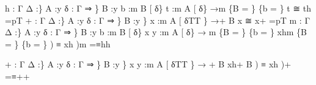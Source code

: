 \documentclass{acm_proc_article-sp}
\begin{document}
{\begin{code}
h : \AgdaBound{\{}Γ Δ :\}
         \AgdaBound{\{}A :y \AgdaBound{\{}δ : Γ ⇒ \}
         \AgdaBound{\{}B :y \AgdaBound{\{}b :m \AgdaBound{(}B [ δ\AgdaFunction{ ]}\}  
         \AgdaBound{\{}t :m \AgdaBound{(}A [ δ\AgdaFunction{ ]}\} 
         →m \{B = \} \{b = \} t ≅ th =pT
+ : \AgdaBound{\{}Γ Δ :\}
         \AgdaBound{\{}A :y \AgdaBound{\{}δ : Γ ⇒ \}
         \AgdaBound{\{}B :y \} 
         \AgdaBound{\{}x :m \AgdaBound{(}A [ δ\AgdaFunction{ ]}T\AgdaFunction{ +}T \}
          →+ B x ≅ x+ =p\AgdaFunction{ [+S]}T
m : \AgdaBound{\{}Γ Δ :\}
         \AgdaBound{\{}A :y \AgdaBound{\{}δ : Γ ⇒ \}
         \AgdaBound{\{}B :y \AgdaBound{\{}b :m \AgdaBound{(}B [ δ\AgdaFunction{ ]}\}  
         \AgdaBound{\{}x y :m \AgdaBound{(}A [ δ\AgdaFunction{ ]}\}
         → m \{B = \} \{b = \} x\AgdaInductiveConstructor{ =}hm \{B = \} \{b = \} ) ≡ \AgdaBound{(}x\AgdaInductiveConstructor{ =}h )m =≡hh

+ : \AgdaBound{\{}Γ Δ :\}
         \AgdaBound{\{}A :y \AgdaBound{\{}δ : Γ ⇒ \}
         \AgdaBound{\{}B :y \} 
         \AgdaBound{\{}x y :m \AgdaBound{(}A [ δ\AgdaFunction{ ]}T\AgdaFunction{ +}T \}
         → + B x\AgdaInductiveConstructor{ =}h+ B ) ≡ \AgdaBound{(}x\AgdaInductiveConstructor{ =}h )+ =≡++


\end{code}}
\end{document}
